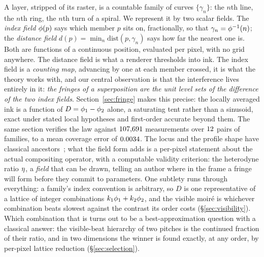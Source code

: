 A layer, stripped of its raster, is a countable family of curves
$\{\gamma_n\}$: the $n$th line, the $n$th ring, the $n$th turn of a spiral. We
represent it by two scalar fields. The \emph{index field} $\phi(p)$ says which
member $p$ sits on, fractionally, so that $\gamma_n=\phi^{-1}(n)$; the
\emph{distance field} $d(p)=\min_n \mathrm{dist}(p,\gamma_n)$ says how far the
nearest one is. Both are functions of a continuous position, evaluated per
pixel, with no grid anywhere. The distance field is what a renderer thresholds
into ink. The index field is a \emph{counting map}, advancing by one at each
member crossed, it is what the theory works with, and our central
observation is that the interference lives entirely in it: \emph{the fringes of
a superposition are the unit level sets of the difference of the two index
fields}. Section~\ref{sec:fringe} makes this precise: the locally averaged
ink is a function of $D=\phi_1-\phi_2$ alone, a saturating tent rather than a
sinusoid, exact under stated local hypotheses and first-order accurate beyond
them. The same section verifies the law against $107{,}691$ measurements
over $12$ pairs of families, to a mean coverage error of
$0.0034$.
The locus and the profile shape have classical
ancestors~\cite{Oster1964, Patorski1976Profile, Amidror1994TConv}; what the
field form adds is a per-pixel statement about the actual compositing operator,
with a computable validity criterion: the heterodyne ratio $\eta$, a
\emph{field} that can be drawn, telling an author where in the frame a fringe
will form before they commit to parameters. One subtlety runs through
everything: a family's index convention is arbitrary, so $D$ is one
representative of a lattice of integer combinations $k_1\phi_1+k_2\phi_2$, and
the visible moir\'e is whichever combination beats slowest against the
contrast its order costs (\S\ref{sec:visibility}). Which combination that is
turns out to be a best-approximation question with a classical answer: the
visible-beat hierarchy of two pitches is the continued fraction of their
ratio, and in two dimensions the winner is found exactly, at any order, by
per-pixel lattice reduction (\S\ref{sec:selection}).

